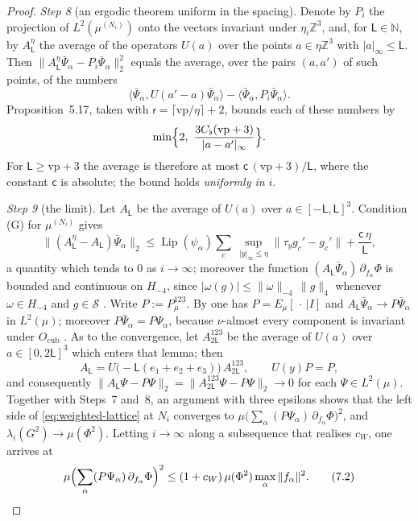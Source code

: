 \documentclass[11pt]{amsart}
\theoremstyle{definition}
\begin{document}
\begin{proof}
\emph{Step 8} (an ergodic theorem uniform in the spacing).
Denote by $P_i$ the projection of $L^2(\mu^{(N_i)})$ onto the vectors invariant under $\eta_i\mathbb Z^3$,
and, for $\mathsf L\in\mathbb N$, by $A^\eta_{\mathsf L}$ the average of the operators $U(a)$ over the points $a\in\eta\mathbb Z^3$ with $|a|_\infty\le\mathsf L$.
Then $\|A^\eta_{\mathsf L}\bar\Psi_\alpha-P_i\bar\Psi_\alpha\|_2^2$ equals the average, over the pairs $(a,a')$ of such points, of the numbers
\begin{equation*}
\langle\bar\Psi_\alpha,U(a'-a)\bar\Psi_\alpha\rangle-\langle\bar\Psi_\alpha,P_i\bar\Psi_\alpha\rangle.
\end{equation*}
Proposition~5.17, taken with $\mathsf r=\lceil\mathrm{vp}/\eta\rceil+2$, bounds each of these numbers by
\begin{equation*}
\min\Bigl\{2,\ \frac{3C_\flat(\mathrm{vp}+3)}{|a-a'|_\infty}\Bigr\}.
\end{equation*}
For $\mathsf L\ge\mathrm{vp}+3$ the average is therefore at most $\mathsf c\,(\mathrm{vp}+3)/\mathsf L$, where the constant $\mathsf c$ is absolute; the bound holds \emph{uniformly in $i$}.

\emph{Step 9} (the limit).
Let $A_{\mathsf L}$ be the average of $U(a)$ over $a\in[-\mathsf L,\mathsf L]^3$.
Condition (G) for $\mu^{(N_i)}$ gives
\begin{equation*}
\|(A^\eta_{\mathsf L}-A_{\mathsf L})\bar\Psi_\alpha\|_2\le\operatorname{Lip}(\psi_\alpha)\sum_c\ \sup_{|y|_\infty\le\eta}\|\tau_yg_c'-g_c'\|+\frac{\mathsf c\,\eta}{\mathsf L},
\end{equation*}
a quantity which tends to $0$ as $i\to\infty$;
moreover the function $(A_{\mathsf L}\bar\Psi_\alpha)\,\partial_{f_\alpha}\Phi$ is bounded and continuous on $H_{-4}$, since $|\omega(g)|\le\|\omega\|_{-4}\,\|g\|_4$ whenever $\omega\in H_{-4}$ and $g\in\mathcal S$ \cite[Section~12.5]{QEDII}.
Write $P:=P^{123}_\mu$.
By \cite[Lemma~8.13\,(iii), (iv)]{QEDI} one has $P=E_\mu[\,\cdot\,|I]$ and $A_{\mathsf L}\bar\Psi_\alpha\to P\bar\Psi_\alpha$ in $L^2(\mu)$;
moreover $P\bar\Psi_\alpha=P\Psi_\alpha$, because $\nu$-almost every component is invariant under $O_{\mathrm{cub}}$ \cite[Theorem~1.3\,(b)(v)]{QEDII}.
As to the convergence, let $A^{123}_{2\mathsf L}$ be the average of $U(a)$ over $a\in[0,2\mathsf L]^3$ which enters that lemma;
then
\begin{equation*}
A_{\mathsf L}=U\bigl(-\mathsf L(e_1+e_2+e_3)\bigr)\,A^{123}_{2\mathsf L},\qquad U(y)P=P,
\end{equation*}
and consequently $\|A_{\mathsf L}\Psi-P\Psi\|_2=\allowbreak \|A^{123}_{2\mathsf L}\Psi-P\Psi\|_2\to0$ for each $\Psi\in L^2(\mu)$.
Together with Steps~7 and~8, an argument with three epsilons shows that the left side of \eqref{eq:weighted-lattice} at $N_i$ converges to $\mu\bigl(\sum_\alpha(P\Psi_\alpha)\,\allowbreak \partial_{f_\alpha}\Phi\bigr)^2$, and $\lambda_i(G^2)\to\mu(\Phi^2)$.
Letting $i\to\infty$ along a subsequence that realises $c_W$, one arrives at
\begin{equation}
\mu\Bigl(\sum_\alpha(P\Psi_\alpha)\,\partial_{f_\alpha}\Phi\Bigr)^2\le(1+c_W)\,\mu(\Phi^2)\max_\alpha\|f_\alpha\|^2.
\tag{7.2}\label{eq:weighted-continuum}
\end{equation}


\end{proof}
\end{document}
